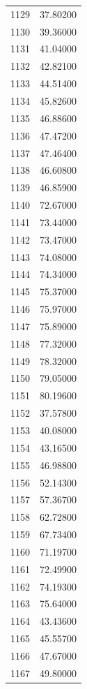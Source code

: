 \documentclass[
  letterpaper,
  DIV=11,
  numbers=noendperiod]{scrreprt}
\begin{document}
\begin{tcolorbox}
\begin{tabular}{lr}
1129 &         37.80200 \\
1130 &         39.36000 \\
1131 &         41.04000 \\
1132 &         42.82100 \\
1133 &         44.51400 \\
1134 &         45.82600 \\
1135 &         46.88600 \\
1136 &         47.47200 \\
1137 &         47.46400 \\
1138 &         46.60800 \\
1139 &         46.85900 \\
1140 &         72.67000 \\
1141 &         73.44000 \\
1142 &         73.47000 \\
1143 &         74.08000 \\
1144 &         74.34000 \\
1145 &         75.37000 \\
1146 &         75.97000 \\
1147 &         75.89000 \\
1148 &         77.32000 \\
1149 &         78.32000 \\
1150 &         79.05000 \\
1151 &         80.19600 \\
1152 &         37.57800 \\
1153 &         40.08000 \\
1154 &         43.16500 \\
1155 &         46.98800 \\
1156 &         52.14300 \\
1157 &         57.36700 \\
1158 &         62.72800 \\
1159 &         67.73400 \\
1160 &         71.19700 \\
1161 &         72.49900 \\
1162 &         74.19300 \\
1163 &         75.64000 \\
1164 &         43.43600 \\
1165 &         45.55700 \\
1166 &         47.67000 \\
1167 &         49.80000 \\

\end{tabular}
\end{tcolorbox}
\end{document}
